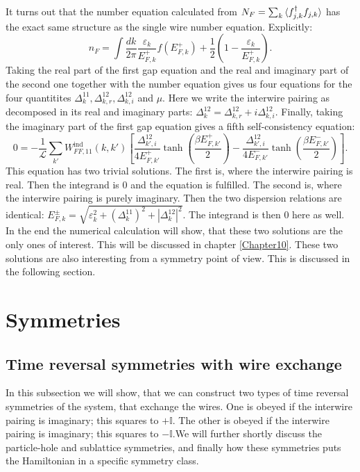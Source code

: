 It turns out that the number equation calculated from $N_F = \sum_k \braket{f^\dagger_{j,k}f_{j,k}}$ has the exact same structure as the single wire number equation. Explicitly: 
\begin{equation}
n_F = \int \frac{dk}{2\pi} \frac{\varepsilon_k}{E^{+}_{F,k}}f(E^{+}_{F,k}) + \frac{1}{2}\left(1 - \frac{\varepsilon_k}{E^{+}_{F,k}}\right). 
\label{eq.2wiresnumberequation}
\end{equation}
Taking the real part of the first gap equation and the real and imaginary part of the second one together with the number equation gives us four equations for the four quantitites $\Delta^{11}_k, \Delta^{12}_{k,r}, \Delta^{12}_{k,i} $ and $\mu$. Here we write the interwire pairing as decomposed in its real and imaginary parts: $\Delta^{12}_k = \Delta^{12}_{k,r} + i\Delta^{12}_{k,i}$. Finally, taking the imaginary part of the first gap equation gives a fifth self-consistency equation:
\begin{equation}
0 = -\frac{1}{\mathcal{L}}\sum_{k'} W^\text{ind}_{FF,11}(k, k')\left[\frac{\Delta^{12}_{k',i}}{4E^{+}_{F,k'}}\tanh\left(\frac{\beta E^{+}_{F,k'}}{2}\right) - \frac{\Delta^{12}_{k',i}}{4E^{-}_{F,k'}}\tanh\left(\frac{\beta E^{-}_{F,k'}}{2}\right)\right].
\end{equation}
This equation has two trivial solutions. The first is, where the interwire pairing is real. Then the integrand is 0 and the equation is fulfilled. The second is, where the interwire pairing is purely imaginary. Then the two dispersion relations are identical: $E^{\pm}_{F,k} = \sqrt{\varepsilon_k^2 + (\Delta^{11}_k)^2 + |\Delta^{12}_k|^2}$. The integrand is then 0 here as well. In the end the numerical calculation will show, that these two solutions are the only ones of interest. This will be discussed in chapter \ref{Chapter10}. These two solutions are also interesting from a symmetry point of view. This is discussed in the following section.

\section{Symmetries}
\label{sec.2wiressymmetries}
\subsection{Time reversal symmetries with wire exchange}
In this subsection we will show, that we can construct two types of time reversal symmetries of the system, that exchange the wires. One is obeyed if the interwire pairing is imaginary; this squares to $+\mathbb{I}$. The other is obeyed if the interwire pairing is imaginary; this squares to $-\mathbb{I}$.We will further shortly discuss the particle-hole and sublattice symmetries, and finally how these symmetries puts the Hamiltonian in a specific symmetry class. 


